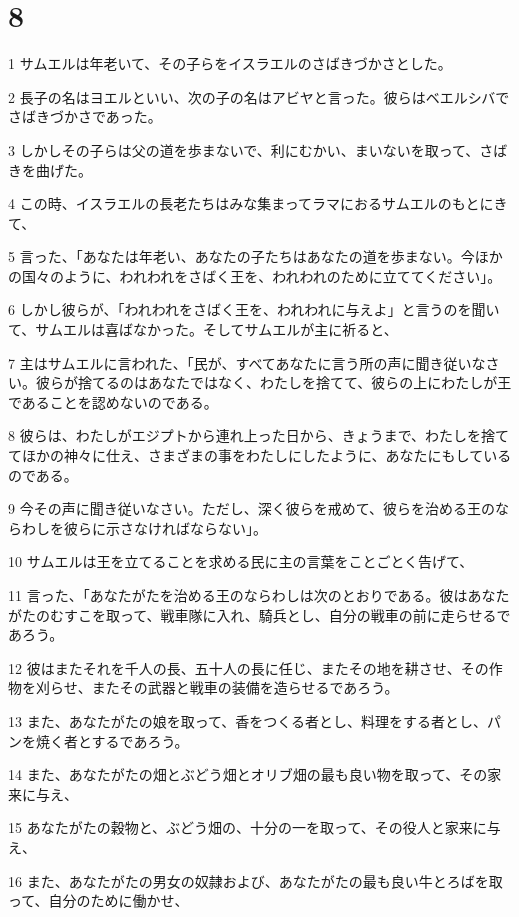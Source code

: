 \chapter{8}

\par 1 サムエルは年老いて、その子らをイスラエルのさばきづかさとした。
\par 2 長子の名はヨエルといい、次の子の名はアビヤと言った。彼らはベエルシバでさばきづかさであった。
\par 3 しかしその子らは父の道を歩まないで、利にむかい、まいないを取って、さばきを曲げた。
\par 4 この時、イスラエルの長老たちはみな集まってラマにおるサムエルのもとにきて、
\par 5 言った、「あなたは年老い、あなたの子たちはあなたの道を歩まない。今ほかの国々のように、われわれをさばく王を、われわれのために立ててください」。
\par 6 しかし彼らが、「われわれをさばく王を、われわれに与えよ」と言うのを聞いて、サムエルは喜ばなかった。そしてサムエルが主に祈ると、
\par 7 主はサムエルに言われた、「民が、すべてあなたに言う所の声に聞き従いなさい。彼らが捨てるのはあなたではなく、わたしを捨てて、彼らの上にわたしが王であることを認めないのである。
\par 8 彼らは、わたしがエジプトから連れ上った日から、きょうまで、わたしを捨ててほかの神々に仕え、さまざまの事をわたしにしたように、あなたにもしているのである。
\par 9 今その声に聞き従いなさい。ただし、深く彼らを戒めて、彼らを治める王のならわしを彼らに示さなければならない」。
\par 10 サムエルは王を立てることを求める民に主の言葉をことごとく告げて、
\par 11 言った、「あなたがたを治める王のならわしは次のとおりである。彼はあなたがたのむすこを取って、戦車隊に入れ、騎兵とし、自分の戦車の前に走らせるであろう。
\par 12 彼はまたそれを千人の長、五十人の長に任じ、またその地を耕させ、その作物を刈らせ、またその武器と戦車の装備を造らせるであろう。
\par 13 また、あなたがたの娘を取って、香をつくる者とし、料理をする者とし、パンを焼く者とするであろう。
\par 14 また、あなたがたの畑とぶどう畑とオリブ畑の最も良い物を取って、その家来に与え、
\par 15 あなたがたの穀物と、ぶどう畑の、十分の一を取って、その役人と家来に与え、
\par 16 また、あなたがたの男女の奴隷および、あなたがたの最も良い牛とろばを取って、自分のために働かせ、
